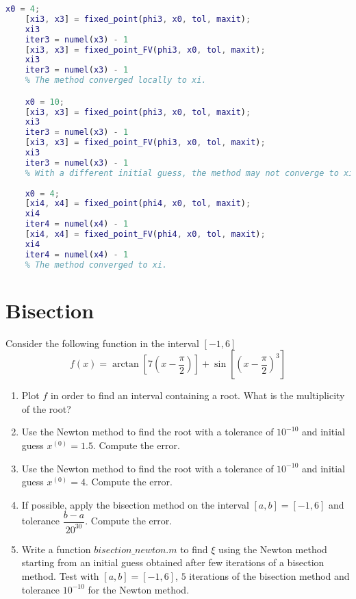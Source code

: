 \documentclass[12pt, a4paper]{report}
\newtheorem[style=M,bodystyle=\normalfont]{theorem}{Theorem}
\newtheorem[style=M,bodystyle=\normalfont]{corollary}{Corollary}
\newtheorem[style=M,bodystyle=\normalfont]{lemma}{Lemma}
\newtheorem[style=M,bodystyle=\normalfont]{definition}{Definition}
\begin{document}
\begin{lstlisting}[language=Matlab]
    x0 = 4;
    [xi3, x3] = fixed_point(phi3, x0, tol, maxit);
    xi3
    iter3 = numel(x3) - 1
    [xi3, x3] = fixed_point_FV(phi3, x0, tol, maxit);
    xi3
    iter3 = numel(x3) - 1
    % The method converged locally to xi.

    x0 = 10;
    [xi3, x3] = fixed_point(phi3, x0, tol, maxit);
    xi3
    iter3 = numel(x3) - 1
    [xi3, x3] = fixed_point_FV(phi3, x0, tol, maxit);
    xi3
    iter3 = numel(x3) - 1
    % With a different initial guess, the method may not converge to xi.
    
    x0 = 4;
    [xi4, x4] = fixed_point(phi4, x0, tol, maxit);
    xi4
    iter4 = numel(x4) - 1
    [xi4, x4] = fixed_point_FV(phi4, x0, tol, maxit);
    xi4
    iter4 = numel(x4) - 1
    % The method converged to xi.
        \end{lstlisting}  

    \newpage 

    \section{Bisection}
        Consider the following function in the interval $[-1, 6]$
        \[f (x) = \arctan\left[7\left(x-\dfrac{\pi}{2}\right)\right]+\sin\left[\left(x-\dfrac{\pi}{2}\right)^{3}\right]\]
        \begin{enumerate}
            \item Plot $f$ in order to find an interval containing a root. What is the multiplicity of the root?
            \item Use the Newton method to find the root with a tolerance of $10^{-10}$ and initial guess $x^{(0)}=1.5$. Compute the error.
            \item Use the Newton method to find the root with a tolerance of $10^{-10}$ and initial guess $x^{(0)}=4$. Compute the error.
            \item If possible, apply the bisection method on the interval $[a, b] = [-1, 6]$ and tolerance $\dfrac{b-a}{20^{30}}$. Compute the error.
            \item Write a function $bisection\_newton.m$ to find $\xi$ using the Newton method starting from an initial guess obtained after few iterations of a bisection method. 
                Test with $[a, b] = [-1, 6]$, $5$ iterations of the bisection method and tolerance $10^{-10}$ for the Newton method.
        \end{enumerate}
\end{document}
